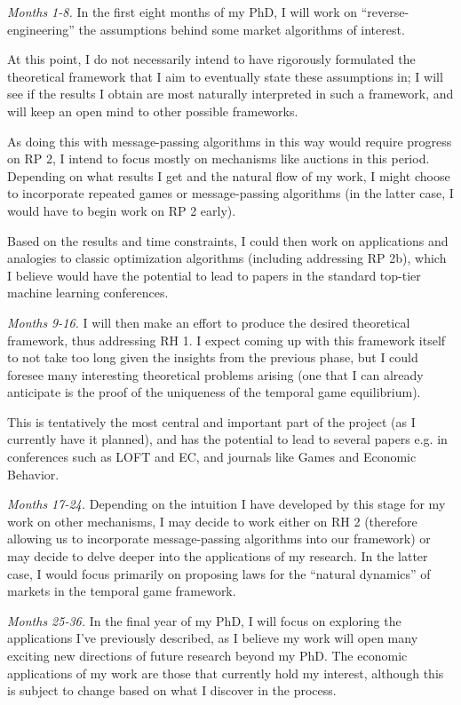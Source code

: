 \documentclass{article}
\newcommand{\substatement}[1]{\par\medskip
  {\emph{#1.}}\space
}
\begin{document}
\substatement{Months 1-8} In the first eight months of my PhD, I will work on ``reverse-engineering'' the assumptions behind some market algorithms of interest.

At this point, I do not necessarily intend to have rigorously formulated the theoretical framework that I aim to eventually state these assumptions in; I will see if the results I obtain are most naturally interpreted in such a framework, and will keep an open mind to other possible frameworks.

As doing this with message-passing algorithms in this way would require progress on RP 2, I intend to focus mostly on mechanisms like auctions in this period. Depending on what results I get and the natural flow of my work, I might choose to incorporate repeated games or message-passing algorithms (in the latter case, I would have to begin work on RP 2 early). 

Based on the results and time constraints, I could then work on applications and analogies to classic optimization algorithms (including addressing RP 2b), which I believe would have the potential to lead to papers in the standard top-tier machine learning conferences.

\substatement{Months 9-16} I will then make an effort to produce the desired theoretical framework, thus addressing RH 1. I expect coming up with this framework itself to not take too long given the insights from the previous phase, but I could foresee many interesting theoretical problems arising (one that I can already anticipate is the proof of the uniqueness of the temporal game equilibrium). 

This is tentatively the most central and important part of the project (as I currently have it planned), and has the potential to lead to several papers e.g. in conferences such as LOFT and EC, and journals like Games and Economic Behavior.

\substatement{Months 17-24} Depending on the intuition I have developed by this stage for my work on other mechanisms, I may decide to work either on RH 2 (therefore allowing us to incorporate message-passing algorithms into our framework) or may decide to delve deeper into the applications of my research. In the latter case, I would focus primarily on proposing laws for the ``natural dynamics'' of markets in the temporal game framework.

\substatement{Months 25-36} In the final year of my PhD, I will focus on exploring the applications I've previously described, as I believe my work will open many exciting new directions of future research beyond my PhD. The economic applications of my work are those that currently hold my interest, although this is subject to change based on what I discover in the process.
\end{document}
